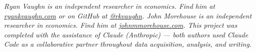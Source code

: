 \documentclass[12pt]{article}
\begin{document}
\vspace{2em}
\noindent\small\textit{Ryan Vaughn is an independent researcher in economics. Find him at \href{https://ryankvaughn.com}{ryankvaughn.com} or on GitHub at \href{https://github.com/rkvaughn}{@rkvaughn}. John Morehouse is an independent researcher in economics. Find him at \href{https://www.johnmmorehouse.com/}{johnmmorehouse.com}. This project was completed with the assistance of Claude (Anthropic) --- both authors used Claude Code as a collaborative partner throughout data acquisition, analysis, and writing.}
\end{document}
